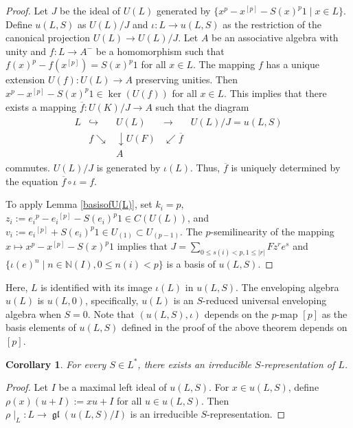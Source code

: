 \documentclass[12pt,MSc]{muthesis_2023}
\theoremstyle{plain}%
\newtheorem{Corollary}[FactCounter]{Corollary} %
\theoremstyle{definition}
\theoremstyle{remark}
\DeclareMathOperator{\gl}{\mathfrak{gl}}
\begin{document}
\begin{proof}
Let $J$ be the ideal of $U(L)$ generated by $\{x^p-x^{[p]}-{S(x)}^p1 \mid x\in L \}$. Define $u(L,S)$ as $U(L)/J$ and $\iota: L\rightarrow u(L,S)$ as the restriction of the canonical projection $U(L)\rightarrow U(L)/J$. Let $A$ be an associative algebra with unity and $f:L\rightarrow A^-$ be a homomorphism such that ${f(x)}^p-f(x^{[p]})={S(x)}^p1$ for all $x\in L$. The mapping $f$ has a unique extension $U(f):U(L)\rightarrow A$ preserving unities. Then $x^p-x^{[p]}-{S(x)}^p1\in \ker(U(f))$ for all $x\in L$. This implies that there exists a mapping $\overline{f}:U(K)/J\rightarrow A$ such that the diagram
\begin{align*}
\begin{matrix}
L& \hookrightarrow &U(L) &\rightarrow& U(L)/J=u(L,S)\\
&f \searrow&\downarrow U(F)&\swarrow \overline{f}&\\
&&A&&
\end{matrix}
\end{align*}
commutes. $U(L)/J$ is generated by $\iota(L)$. Thus, $\overline{f}$ is uniquely determined by the equation $\overline{f}\circ \iota=f$.

To apply Lemma \ref{basisofU(L)}, set $k_i=p$, $z_i:= {e_i}^p-{e_i}^{[p]}-{S(e_i)}^p1\in C(U(L))$, and $v_i := {e_i}^{[p]}+{S(e_i)}^p 1\in U_{(1)}\subset U_{(p-1)}$. The $p$-semilinearity of the mapping $x\mapsto x^p-x^{[p]}-{S(x)}^p1$ implies that $J=\sum_{0\leq s(i)<p, 1 \leq |r|}Fz^re^s$ and $\{{\iota(e)}^n \mid n\in \mathbb{N}(I), 0 \leq n(i) <p\}$ is a basis of $u(L,S)$.
\end{proof}

Here, $L$ is identified with its image $\iota(L)$ in $u(L,S)$. The enveloping algebra $u(L)$ is $u(L,0)$, specifically, $u(L)$ is an $S$-reduced universal enveloping algebra when $S=0$. Note that $(u(L, S),\iota)$ depends on the $p$-map $[p]$ as the basis elements of $u(L, S)$ defined in the proof of the above theorem depends on $[p]$.

\begin{Corollary}
For every $S\in L^*$, there exists an irreducible $S$-representation of $L$.
\end{Corollary}

\begin{proof}
Let $I$ be a maximal left ideal of $u(L,S)$. For $x\in u(L,S)$, define $\rho(x)(u+I):=xu+I$ for all $u\in u(L,S)$. Then $\rho\mid_L: L \rightarrow \gl(u(L,S)/I)$ is an irreducible $S$-representation.
\end{proof}
\end{document}
